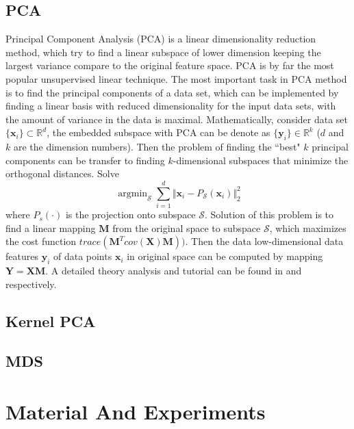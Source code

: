 \documentclass[journal]{IEEEtran}
\DeclareMathOperator*{\argmin}{argmin}
\begin{document}
\subsection{PCA}
Principal Component Analysis (PCA) is a linear dimensionality reduction method, which try to find a linear subspace of lower dimension keeping the largest variance compare to the original feature space.
PCA is by far the most popular unsupervised linear technique.
The most important task in PCA method is to find the principal components of a data set, which can be implemented by finding a linear basis with reduced dimensionality for the input data sets, with the amount of variance in the data is maximal.
Mathematically, consider data set $\{\boldsymbol{x}_i\} \subset \mathbb{R}^d$, the embedded subspace with PCA can be denote as $\{\boldsymbol{y}_i\} \in \mathbb{R}^k$ ($d$ and $k$ are the dimension numbers). 
Then the problem of finding the ``best"  $k$ principal components can be transfer to finding $k$-dimensional subspaces that minimize the orthogonal distances.
Solve 
\begin{equation}
\label{equPCA}
\argmin_\mathcal{S} \sum_{i=1}^d \Vert \boldsymbol{x}_i - P_\mathcal{S}(\boldsymbol{x}_i) \Vert_2^2
\end{equation}
where $P_s(\cdot)$ is the projection onto subspace $\mathcal{S}$.
Solution of this problem is to find a linear mapping $\boldsymbol{M}$ from the original space to subspace $\mathcal{S}$, which maximizes the cost function $trace(\boldsymbol{M}^Tcov(\boldsymbol{X})\boldsymbol{M}))$. Then the data low-dimensional data features $\boldsymbol{y}_i$ of data points $\boldsymbol{x}_i$ in original space can be computed by mapping $\boldsymbol{Y} = \boldsymbol{X} \boldsymbol{M}$.
A detailed theory analysis and tutorial can be found in \cite{abdi2010principal} and \cite{shlens2014tutorial} respectively. 

\subsection{Kernel PCA}



\subsection{MDS}




\section{Material And Experiments}
\end{document}
